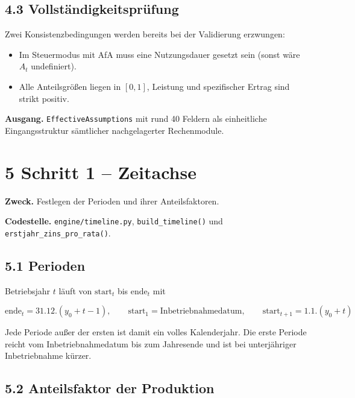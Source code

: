 \documentclass[
  a4paper,
  10pt]{article}
\providecommand{\tightlist}{%
  \setlength{\itemsep}{0pt}\setlength{\parskip}{0pt}}
\begin{document}
\hypertarget{vollstuxe4ndigkeitspruxfcfung}{%
\subsection{4.3
Vollständigkeitsprüfung}\label{vollstuxe4ndigkeitspruxfcfung}}

Zwei Konsistenzbedingungen werden bereits bei der Validierung erzwungen:

\begin{itemize}
\tightlist
\item
  Im Steuermodus mit AfA muss eine Nutzungsdauer gesetzt sein (sonst
  wäre \(A_t\) undefiniert).
\item
  Alle Anteilsgrößen liegen in \([0,1]\), Leistung und spezifischer
  Ertrag sind strikt positiv.
\end{itemize}

\textbf{Ausgang.} \texttt{EffectiveAssumptions} mit rund 40 Feldern als
einheitliche Eingangsstruktur sämtlicher nachgelagerter Rechenmodule.

\hypertarget{schritt-1-zeitachse}{%
\section{5 Schritt 1 -- Zeitachse}\label{schritt-1-zeitachse}}

\textbf{Zweck.} Festlegen der Perioden und ihrer Anteilsfaktoren.

\textbf{Codestelle.} \nolinkurl{engine/timeline.py},
\texttt{build\_timeline()} und \texttt{erstjahr\_zins\_pro\_rata()}.

\hypertarget{perioden}{%
\subsection{5.1 Perioden}\label{perioden}}

Betriebsjahr \(t\) läuft von \(\mathrm{start}_t\) bis
\(\mathrm{ende}_t\) mit

\[ \mathrm{ende}_t = 31.12.(y_0 + t - 1), \qquad \mathrm{start}_1 = \text{Inbetriebnahmedatum}, \qquad \mathrm{start}_{t+1} = 1.1.(y_0 + t) \]

Jede Periode außer der ersten ist damit ein volles Kalenderjahr. Die
erste Periode reicht vom Inbetriebnahmedatum bis zum Jahresende und ist
bei unterjähriger Inbetriebnahme kürzer.

\hypertarget{anteilsfaktor-der-produktion}{%
\subsection{5.2 Anteilsfaktor der
Produktion}\label{anteilsfaktor-der-produktion}}
\end{document}
